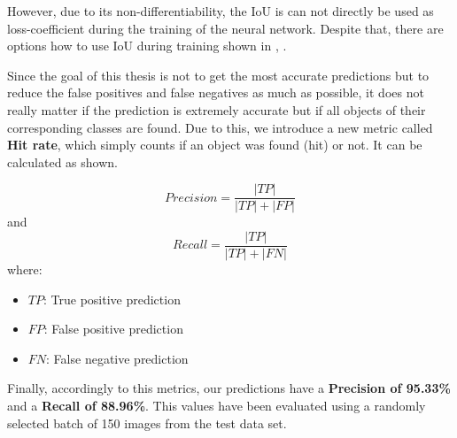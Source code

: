 However, due to its non-differentiability, the IoU is can not directly be used as loss-coefficient during the training of the neural network. Despite that, there are options how to use IoU during training shown in \cite{Bebis.2016}, \cite{Yu.20160804}.

Since the goal of this thesis is not to get the most accurate predictions but to reduce the false positives and false negatives as much as possible, it does not really matter if the prediction is extremely accurate but if all objects of their corresponding classes are found. Due to this, we introduce a new metric called \textbf{Hit rate}, which simply counts if an object was found (hit) or not. It can be calculated as shown.

\begin{equation}
	Precision = \dfrac{|TP|}{|TP| + |FP|}
\end{equation}
and
\begin{equation}
	Recall = \dfrac{|TP|}{|TP| + |FN|}
\end{equation}
where:
\begin{itemize}[label=]
    \item $TP$: True positive prediction
    \item $FP$: False positive prediction
    \item $FN$: False negative prediction
\end{itemize}

Finally, accordingly to this metrics, our predictions have a \textbf{Precision of 95.33\%} and a \textbf{Recall of 88.96\%}. This values have been evaluated using a randomly selected batch of 150 images from the test data set.

